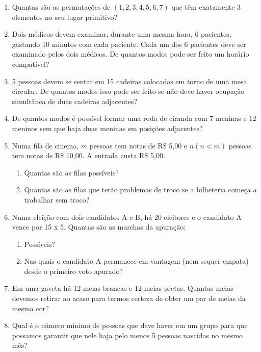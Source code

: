 \documentclass[a4paper,12pt]{letter}  %
\begin{document}
\begin{enumerate}
	\item Quantas são as permutações de $(1, 2, 3, 4, 5, 6, 7)$ que têm exatamente 3 elementos no seu lugar primitivo?
	\item Dois médicos devem examinar, durante uma mesma hora, 6 pacientes, gastando 10 minutos com cada paciente. Cada um dos 6 pacientes deve ser examinado pelos dois médicos. De quantos modos pode ser feito um horário compatível?

	\item 5 pessoas devem se sentar em 15 cadeiras colocadas em torno de uma mesa circular. De quantos modos isso pode ser feito se não deve haver ocupação simultânea de duas cadeiras adjacentes?
	\item De quantos modos é possível formar uma roda de ciranda com 7 meninas e 12 meninos sem que haja duas meninas em posições adjacentes?

	\item Numa fila de cinema, $m$ pessoas tem notas de R\$ 5,00 e $n (n<m)$ pessoas tem notas de R\$ 10,00. A entrada custa R\$ 5,00.
	\begin{enumerate}
        \item Quantas são as filas possíveis?
        \item Quantas são as filas que terão problemas de troco se a bilheteria começa a trabalhar sem troco?
    \end{enumerate}
	\item Numa eleição com dois candidatos A e B, há 20 eleitores e o candidato A vence por 15 x 5. Quantas são as marchas da apuração:
	\begin{enumerate}
        \item Possíveis?
        \item Nas quais o candidato A permanece em vantagem (nem sequer empata) desde o primeiro voto apurado?
    \end{enumerate}

	\item Em uma gaveta há 12 meias brancas e 12 meias pretas. Quantas meias devemos retirar ao acaso para termos certeza de obter um par de meias da mesma cor?
	\item Qual é o número mínimo de pessoas que deve haver em um grupo para que possamos garantir que nele haja pelo menos 5 pessoas nascidas no mesmo mês?

\end{enumerate}
\end{document}
